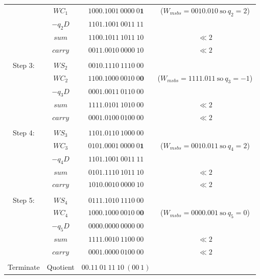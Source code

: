 \documentclass[12pt]{article}
\begin{document}
{\begin{center}
\begin{tabular}{cccc}
            &$WC_1      $&$1000.1001\ 0000\ 0\mathbf{1}$&($W_{msbs}=0010.010\ \text{so}\ q_2=2$)\\
            &$-q_2D     $&$1101.1001\ 0011\ 11$\\
    \cline{2-3}
            &$sum       $&$1100.1011\ 1011\ 10$&$\ll2$\\
            &$carry     $&$0011.0010\ 0000\ 10$&$\ll2$\\
    \hdashline\\
    Step 3: &$WS_2      $&$0010.1110\ 1110\ 00$&\\
            &$WC_2      $&$1100.1000\ 0010\ 0\mathbf{0}$&($W_{msbs}=1111.011\ \text{so}\ q_3=-1$)\\
            &$-q_3D     $&$0001.0011\ 0110\ 00$\\
    \cline{2-3}
            &$sum       $&$1111.0101\ 1010\ 00$&$\ll2$\\
            &$carry     $&$0001.0100\ 0100\ 00$&$\ll2$\\
    \hdashline\\
    Step 4: &$WS_3      $&$1101.0110\ 1000\ 00$&\\
            &$WC_3      $&$0101.0001\ 0000\ 0\mathbf{1}$&($W_{msbs}=0010.011\ \text{so}\ q_4=2$)\\
            &$-q_4D     $&$1101.1001\ 0011\ 11$\\
    \cline{2-3}
            &$sum       $&$0101.1110\ 1011\ 10$&$\ll2$\\
            &$carry     $&$1010.0010\ 0000\ 10$&$\ll2$\\
    \hdashline\\
    Step 5: &$WS_4      $&$0111.1010\ 1110\ 00$&\\
            &$WC_4      $&$1000.1000\ 0010\ 0\mathbf{0}$&($W_{msbs}=0000.001\ \text{so}\ q_5=0$)\\
            &$-q_5D     $&$0000.0000\ 0000\ 00$\\
    \cline{2-3}
            &$sum       $&$1111.0010\ 1100\ 00$&$\ll2$\\
            &$carry     $&$0001.0000\ 0100\ 00$&$\ll2$\\
    \hdashline\\
    Terminate&Quotient&$00.11\ 01\ 11\ 10\ (00\ 1)$
\end{tabular}
\end{center}
}
\end{document}
